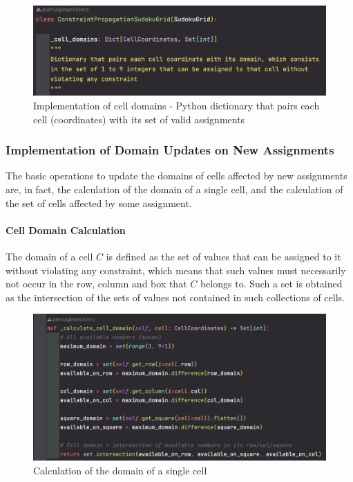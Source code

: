 \begin{figure}[h]
    \centering
    \includegraphics[scale=0.65]{assignment-1/images/cp/domains-1.png}
    \caption{Implementation of cell domains - Python dictionary that pairs each cell (coordinates) with its set of valid assignments}
    \label{fig:domain_1}
\end{figure}

\subsubsection{Implementation of Domain Updates on New Assignments}

The basic operations to update the domains of cells affected by new assignments are, in fact, the calculation of the domain of a single cell, and the calculation of the set of cells affected by some assignment.

\paragraph{Cell Domain Calculation} The domain of a cell $C$ is defined as the set of values that can be assigned to it without violating any constraint, which means that such values must necessarily not occur in the row, column and box that $C$ belongs to. Such a set is obtained as the intersection of the sets of values not contained in such collections of cells.

\begin{figure}[h]
    \centering
    \includegraphics[scale=0.65]{assignment-1/images/cp/domains-2-calc-cell-dom.png}
    \caption{Calculation of the domain of a single cell}
    \label{fig:domain_2}
\end{figure}


